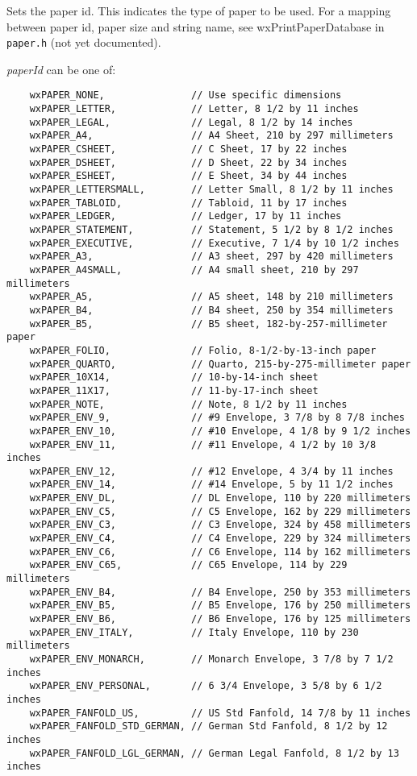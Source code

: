 Sets the paper id. This indicates the type of paper to be used. For a mapping between
paper id, paper size and string name, see wxPrintPaperDatabase in {\tt paper.h} (not yet documented).

{\it paperId} can be one of:

{\small
\begin{verbatim}
    wxPAPER_NONE,               // Use specific dimensions
    wxPAPER_LETTER,             // Letter, 8 1/2 by 11 inches
    wxPAPER_LEGAL,              // Legal, 8 1/2 by 14 inches
    wxPAPER_A4,                 // A4 Sheet, 210 by 297 millimeters
    wxPAPER_CSHEET,             // C Sheet, 17 by 22 inches
    wxPAPER_DSHEET,             // D Sheet, 22 by 34 inches
    wxPAPER_ESHEET,             // E Sheet, 34 by 44 inches
    wxPAPER_LETTERSMALL,        // Letter Small, 8 1/2 by 11 inches
    wxPAPER_TABLOID,            // Tabloid, 11 by 17 inches
    wxPAPER_LEDGER,             // Ledger, 17 by 11 inches
    wxPAPER_STATEMENT,          // Statement, 5 1/2 by 8 1/2 inches
    wxPAPER_EXECUTIVE,          // Executive, 7 1/4 by 10 1/2 inches
    wxPAPER_A3,                 // A3 sheet, 297 by 420 millimeters
    wxPAPER_A4SMALL,            // A4 small sheet, 210 by 297 millimeters
    wxPAPER_A5,                 // A5 sheet, 148 by 210 millimeters
    wxPAPER_B4,                 // B4 sheet, 250 by 354 millimeters
    wxPAPER_B5,                 // B5 sheet, 182-by-257-millimeter paper
    wxPAPER_FOLIO,              // Folio, 8-1/2-by-13-inch paper
    wxPAPER_QUARTO,             // Quarto, 215-by-275-millimeter paper
    wxPAPER_10X14,              // 10-by-14-inch sheet
    wxPAPER_11X17,              // 11-by-17-inch sheet
    wxPAPER_NOTE,               // Note, 8 1/2 by 11 inches
    wxPAPER_ENV_9,              // #9 Envelope, 3 7/8 by 8 7/8 inches
    wxPAPER_ENV_10,             // #10 Envelope, 4 1/8 by 9 1/2 inches
    wxPAPER_ENV_11,             // #11 Envelope, 4 1/2 by 10 3/8 inches
    wxPAPER_ENV_12,             // #12 Envelope, 4 3/4 by 11 inches
    wxPAPER_ENV_14,             // #14 Envelope, 5 by 11 1/2 inches
    wxPAPER_ENV_DL,             // DL Envelope, 110 by 220 millimeters
    wxPAPER_ENV_C5,             // C5 Envelope, 162 by 229 millimeters
    wxPAPER_ENV_C3,             // C3 Envelope, 324 by 458 millimeters
    wxPAPER_ENV_C4,             // C4 Envelope, 229 by 324 millimeters
    wxPAPER_ENV_C6,             // C6 Envelope, 114 by 162 millimeters
    wxPAPER_ENV_C65,            // C65 Envelope, 114 by 229 millimeters
    wxPAPER_ENV_B4,             // B4 Envelope, 250 by 353 millimeters
    wxPAPER_ENV_B5,             // B5 Envelope, 176 by 250 millimeters
    wxPAPER_ENV_B6,             // B6 Envelope, 176 by 125 millimeters
    wxPAPER_ENV_ITALY,          // Italy Envelope, 110 by 230 millimeters
    wxPAPER_ENV_MONARCH,        // Monarch Envelope, 3 7/8 by 7 1/2 inches
    wxPAPER_ENV_PERSONAL,       // 6 3/4 Envelope, 3 5/8 by 6 1/2 inches
    wxPAPER_FANFOLD_US,         // US Std Fanfold, 14 7/8 by 11 inches
    wxPAPER_FANFOLD_STD_GERMAN, // German Std Fanfold, 8 1/2 by 12 inches
    wxPAPER_FANFOLD_LGL_GERMAN, // German Legal Fanfold, 8 1/2 by 13 inches


\end{verbatim}}
